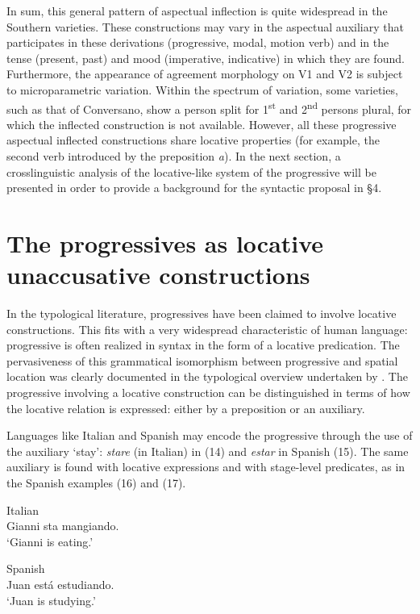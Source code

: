 \documentclass[output=paper]{langsci/langscibook}
\begin{document}
In sum, this general pattern of aspectual inflection is quite widespread in the Southern varieties. These constructions may vary in the aspectual auxiliary that participates in these derivations (progressive, modal, motion verb) and in the tense (present, past) and mood (imperative, indicative) in which they are found. Furthermore, the appearance of agreement morphology on V1 and V2 is subject to microparametric variation. Within the spectrum of variation, some varieties, such as that of Conversano, show a person split for 1\textsuperscript{st} and 2\textsuperscript{nd} persons plural, for which the inflected construction is not available. However, all these progressive aspectual inflected constructions share locative properties (for example, the second verb introduced by the preposition \textit{a}). In the next section, a crosslinguistic analysis of the locative-like system of the progressive will be presented in order to provide a background for the syntactic proposal in §4.

\section{The progressives as locative unaccusative constructions}%
In the typological literature, progressives have been claimed to involve locative constructions. This fits with a very widespread characteristic of human language: progressive is often realized in syntax in the form of a locative predication. The pervasiveness of this grammatical isomorphism between progressive and spatial location was clearly documented in the typological overview undertaken by \citet{Bybee1994}. The progressive involving a locative construction can be distinguished in terms of how the locative relation is expressed: either by a preposition or an auxiliary.

Languages like Italian and Spanish may encode the progressive through the use of the auxiliary ‘stay’: \textit{stare} (in Italian) in (14) and \textit{estar} in Spanish (15). The same auxiliary is found with locative expressions and with stage-level predicates, as in the Spanish examples (16) and (17).

\ea%
        Italian\\
        Gianni sta mangiando.\\
    \glt ‘Gianni is eating.’
\z

\ea%
         Spanish\\
        Juan está estudiando.\\
    \glt ‘Juan is studying.’
\z
\end{document}
